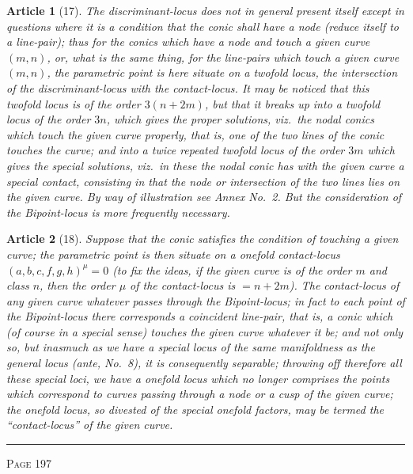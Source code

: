 \documentclass[11pt,a4paper]{article}
\theoremstyle{cayley}
\newtheorem{art}{Article}
\begin{document}
\begin{art}[17]
The discriminant-locus does not in general present itself except in questions where it is a condition that the conic shall have a node (reduce itself to a line-pair); thus for the conics which have a node and touch a given curve $(m, n)$, or, what is the same thing, for the line-pairs which touch a given curve $(m, n)$, the parametric point is here situate on a twofold locus, the intersection of the discriminant-locus with the contact-locus. It may be noticed that this twofold locus is of the order $3(n+2m)$, but that it breaks up into a twofold locus of the order $3n$, which gives the proper solutions, viz.\ the nodal conics which touch the given curve properly, that is, one of the two lines of the conic touches the curve; and into a twice repeated twofold locus of the order $3m$ which gives the special solutions, viz.\ in these the nodal conic has with the given curve a special contact, consisting in that the node or intersection of the two lines lies on the given curve. By way of illustration see Annex No.~2. But the consideration of the Bipoint-locus is more frequently necessary.
\end{art}

\begin{art}[18]
Suppose that the conic satisfies the condition of touching a given curve; the parametric point is then situate on a onefold contact-locus $(a, b, c, f, g, h)^\mu = 0$ (to fix the ideas, if the given curve is of the order $m$ and class $n$, then the order $\mu$ of the contact-locus is $= n + 2m$). The contact-locus of any given curve whatever passes through the Bipoint-locus; in fact to each point of the Bipoint-locus there corresponds a coincident line-pair, that is, a conic which (of course in a special sense) touches the given curve whatever it be; and not only so, but inasmuch as we have a special locus of the same manifoldness as the general locus (ante, No.~8), it is consequently separable; throwing off therefore all these special loci, we have a onefold locus which no longer comprises the points which correspond to curves passing through a node or a cusp of the given curve; the onefold locus, so divested of the special onefold factors, may be termed the ``contact-locus'' of the given curve.
\end{art}

\vspace{1em}
\noindent\rule{\textwidth}{0.4pt}
\begin{center}\textsc{Page 197}\end{center}
\newpage
\end{document}
